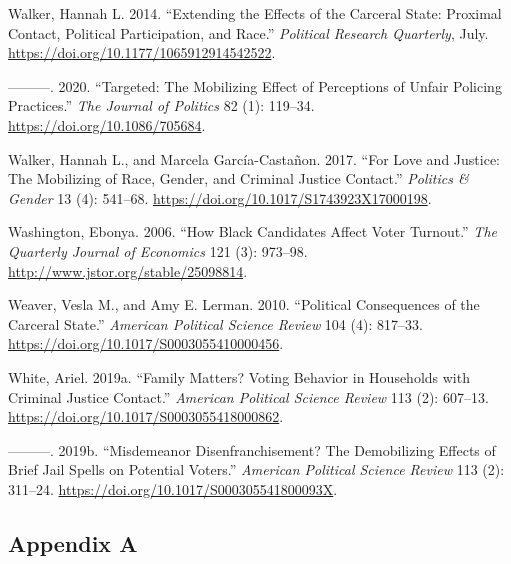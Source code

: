 \documentclass[
  12pt,
]{article}
\newlength{\cslhangindent}
\newenvironment{cslreferences}%
  {\setlength{\parindent}{0pt}%
  \everypar{\setlength{\hangindent}{\cslhangindent}}\ignorespaces}%
  {\par}
\begin{document}
\begin{cslreferences}
\leavevmode\hypertarget{ref-Walker2014}{}%
Walker, Hannah L. 2014. ``Extending the Effects of the Carceral State: Proximal Contact, Political Participation, and Race.'' \emph{Political Research Quarterly}, July. \url{https://doi.org/10.1177/1065912914542522}.

\leavevmode\hypertarget{ref-Walker2020}{}%
---------. 2020. ``Targeted: The Mobilizing Effect of Perceptions of Unfair Policing Practices.'' \emph{The Journal of Politics} 82 (1): 119--34. \url{https://doi.org/10.1086/705684}.

\leavevmode\hypertarget{ref-Walker2017}{}%
Walker, Hannah L., and Marcela García-Castañon. 2017. ``For Love and Justice: The Mobilizing of Race, Gender, and Criminal Justice Contact.'' \emph{Politics \& Gender} 13 (4): 541--68. \url{https://doi.org/10.1017/S1743923X17000198}.

\leavevmode\hypertarget{ref-Washington2006}{}%
Washington, Ebonya. 2006. ``How Black Candidates Affect Voter Turnout.'' \emph{The Quarterly Journal of Economics} 121 (3): 973--98. \url{http://www.jstor.org/stable/25098814}.

\leavevmode\hypertarget{ref-Weaver2010}{}%
Weaver, Vesla M., and Amy E. Lerman. 2010. ``Political Consequences of the Carceral State.'' \emph{American Political Science Review} 104 (4): 817--33. \url{https://doi.org/10.1017/S0003055410000456}.

\leavevmode\hypertarget{ref-White2019a}{}%
White, Ariel. 2019a. ``Family Matters? Voting Behavior in Households with Criminal Justice Contact.'' \emph{American Political Science Review} 113 (2): 607--13. \url{https://doi.org/10.1017/S0003055418000862}.

\leavevmode\hypertarget{ref-White2019}{}%
---------. 2019b. ``Misdemeanor Disenfranchisement? The Demobilizing Effects of Brief Jail Spells on Potential Voters.'' \emph{American Political Science Review} 113 (2): 311--24. \url{https://doi.org/10.1017/S000305541800093X}.
\end{cslreferences}

\newpage
{}

\hypertarget{appendix-a}{%
\subsection*{Appendix A}\label{appendix-a}}
\end{document}
